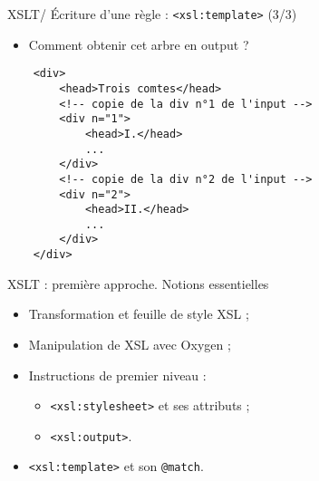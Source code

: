 \documentclass{beamer}
\begin{document}
    \begin{frame}[fragile]{XSLT/ Écriture d'une règle : \texttt{<xsl:template>} (3/3)}
    \Large
        \begin{itemize}
            \item Comment obtenir cet arbre en output ?
        \end{itemize}
        \normalsize
        \begin{verbatim}
    <div>
        <head>Trois comtes</head>
        <!-- copie de la div n°1 de l'input -->
        <div n="1">
            <head>I.</head>
            ...
        </div>
        <!-- copie de la div n°2 de l'input -->
        <div n="2">
            <head>II.</head>
            ...
        </div>
    </div>
        \end{verbatim}
        
    \end{frame}

    \begin{frame}{XSLT : première approche. Notions essentielles}
        \Large
        \begin{itemize}
            \item Transformation et feuille de style XSL ;
            \bigskip
            \item Manipulation de XSL avec Oxygen ;
            \bigskip
            \item Instructions de premier niveau :
            \begin{itemize}
            \Large
                \item \texttt{<xsl:stylesheet>} et ses attributs ;
                \item \texttt{<xsl:output>}.
            \end{itemize}
            \bigskip
            \item \texttt{<xsl:template>} et son \texttt{@match}.
        \end{itemize}
    \end{frame}
\end{document}
